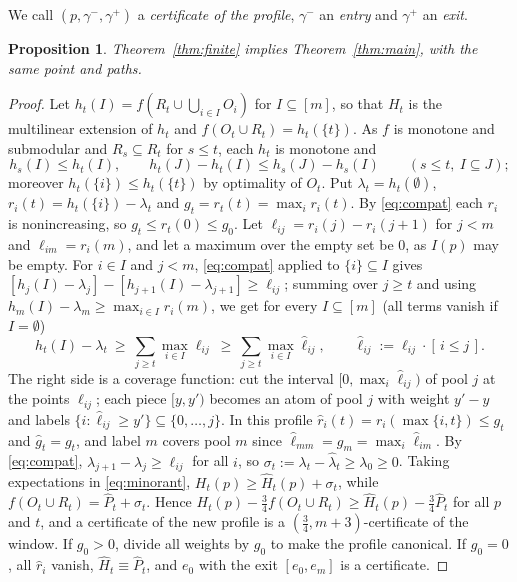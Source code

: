 \documentclass[11pt,a4paper]{article}
\numberwithin{equation}{section}
\newtheorem{proposition}[theorem]{Proposition}
\theoremstyle{definition}
\newcommand{\tq}{\tfrac34}
\begin{document}
We call $(p,\gamma^-,\gamma^+)$ a \emph{certificate of the profile}, $\gamma^-$
an \emph{entry} and $\gamma^+$ an \emph{exit}.

\begin{proposition}\label{prop:reduction}Theorem~\ref{thm:finite} implies Theorem~\ref{thm:main}, with the same point and
paths.
\end{proposition}

\begin{proof}
Let $h_t(I)=f(R_t\cup\bigcup_{i\in I}O_i)$ for $I\subseteq[m]$, so that $H_t$ is
the multilinear extension of $h_t$ and $f(O_t\cup R_t)=h_t(\{t\})$. As $f$ is
monotone and submodular and $R_s\subseteq R_t$ for $s\le t$, each $h_t$ is
monotone and
\begin{equation}\label{eq:compat}
h_s(I)\le h_t(I),\qquad h_t(J)-h_t(I)\le h_s(J)-h_s(I)\qquad(s\le t,\ I\subseteq J);
\end{equation}
moreover $h_t(\{i\})\le h_t(\{t\})$ by optimality of $O_t$. Put
$\lambda_t=h_t(\emptyset)$, $r_i(t)=h_t(\{i\})-\lambda_t$ and $g_t=r_t(t)=\max_ir_i(t)$.
By \eqref{eq:compat} each $r_i$ is nonincreasing, so $g_t\le r_t(0)\le g_0$. Let
$\ell_{ij}=r_i(j)-r_i(j+1)$ for $j<m$ and $\ell_{im}=r_i(m)$, and let a maximum
over the empty set be $0$, as $I(p)$ may be empty. For $i\in I$ and
$j<m$, \eqref{eq:compat} applied to $\{i\}\subseteq I$ gives
$[h_j(I)-\lambda_j]-[h_{j+1}(I)-\lambda_{j+1}]\ge\ell_{ij}$; summing over $j\ge t$
and using $h_m(I)-\lambda_m\ge\max_{i\in I}r_i(m)$, we get for every
$I\subseteq[m]$ (all terms vanish if $I=\emptyset$)
\begin{equation}\label{eq:minorant}
h_t(I)-\lambda_t\ \ge\ \sum_{j\ge t}\max_{i\in I}\ell_{ij}\ \ge\
\sum_{j\ge t}\max_{i\in I}\hat\ell_{ij},\qquad \hat\ell_{ij}:=\ell_{ij}\cdot[\,i\le j\,].
\end{equation}
The right side is a coverage function: cut the interval
$[0,\max_i\hat\ell_{ij})$ of pool $j$ at the points $\hat\ell_{ij}$; each piece
$[y,y')$ becomes an atom of pool $j$ with weight $y'-y$ and labels
$\{i:\hat\ell_{ij}\ge y'\}\subseteq\{0,\dots,j\}$. In this profile
$\hat r_i(t)=r_i(\max\{i,t\})\le g_t$ and $\hat g_t=g_t$, and label $m$ covers
pool $m$ since $\hat\ell_{mm}=g_m=\max_i\hat\ell_{im}$. By \eqref{eq:compat},
$\lambda_{j+1}-\lambda_j\ge\ell_{ij}$ for all $i$, so
$\sigma_t:=\lambda_t-\hat\lambda_t\ge\lambda_0\ge0$. Taking expectations in
\eqref{eq:minorant}, $H_t(p)\ge\hat H_t(p)+\sigma_t$, while
$f(O_t\cup R_t)=\hat P_t+\sigma_t$. Hence
$H_t(p)-\tq f(O_t\cup R_t)\ge\hat H_t(p)-\tq\hat P_t$ for all $p$ and $t$, and a
certificate of the new profile is a $(\frac34,m+3)$-certificate of the window.
If $g_0>0$, divide all weights by $g_0$ to make the profile canonical. If
$g_0=0$, all $\hat r_i$ vanish, $\hat H_t\equiv\hat P_t$, and $e_0$ with the
exit $[e_0,e_m]$ is a certificate.
\end{proof}
\end{document}
